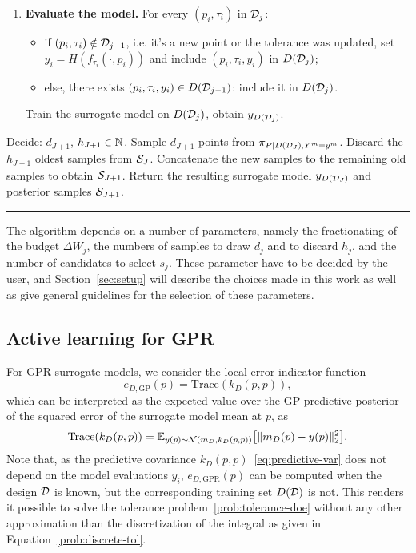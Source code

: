 \begin{enumerate}
    \item \textbf{Evaluate the model.} \newline
    For every $(p_i, \tau_i )$ in $\mathcal D_j$: \begin{itemize}[nosep]
        \item if $(p_i, \tau_i ) \notin \mathcal D_{j-1}$, i.e. it's a new point or the tolerance was updated, set $y_i = H(f_{\tau_i}(\cdot, p_i))$ and include $(p_i, \tau_i, y_i)$ in $D(\mathcal D_j)$;
        \item else, there exists $(p_i, \tau_i, y_i) \in D(\mathcal D_{j-1})$: include it in $D(\mathcal D_j)$.
    \end{itemize}
    Train the surrogate model on $D(\mathcal D_j)$, obtain $y_{D(\mathcal D_j)}$.
\end{enumerate}
Decide: $d_{J+1}$, $h_{J+1} \in \mathbb N$. \newline
Sample $d_{J+1}$ points from $\pi_{P \mid D(\mathcal D_J), Y^m = y^m}$. \newline
Discard the $h_{J+1}$ oldest samples from $\mathcal S_J$. \newline
Concatenate the new samples to the remaining old samples to obtain $\mathcal S_{J+1}$. \newline
Return the resulting surrogate model $y_{D(\mathcal D_J)}$ and posterior samples $\mathcal S_{J+1}$.
\par\noindent\rule[3.5mm]{\textwidth}{0.4pt}

The algorithm depends on a number of parameters, namely the fractionating of the budget $\Delta W_j$, the numbers of samples to draw $d_j$ and to discard $h_j$, and the number of candidates to select $s_j$.
These parameter have to be decided by the user, and Section~\ref{sec:setup} will describe the choices made in this work as well as give general guidelines for the selection of these parameters. 

\subsection{Active learning for GPR}\label{sec:GPAL}

For GPR surrogate models, we consider the local error indicator function 
\begin{equation} \label{eq:loc-err-GP}
    e_{D, \text{GP}}(p) = \text{Trace} (k_D(p,p)),
\end{equation}
which can be interpreted as the expected value over the GP predictive posterior of the squared error of the surrogate model mean at $p$, as
\[
    \text{Trace} (k_D(p,p)) = \mathbb E_{y(p) \sim \mathcal N (m_D, k_D(p,p)) } \big[ \| m_{D}(p) - y(p)\|_2^2 \big].
\]
Note that, as the predictive covariance $k_D(p,p)$~\eqref{eq:predictive-var} does not depend on the model evaluations $y_i$, $e_{D, \text{GPR}}(p)$ can be computed when the design $\mathcal D$ is known, but the corresponding training set $D(\mathcal D)$ is not. 
This renders it possible to solve the tolerance problem~\eqref{prob:tolerance-doe} without any other approximation than the discretization of the integral as given in Equation~\eqref{prob:discrete-tol}.  \medbreak

